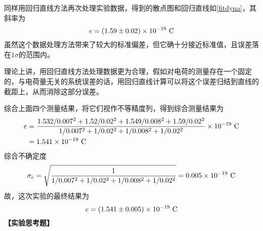 \documentclass[11pt,a4paper]{ctexart}
\newcommand{\beq}{\begin{equation}}
\newcommand{\eeq}{\end{equation}}
\newcommand{\bea}{\begin{equation}\begin{aligned}}
\newcommand{\eea}{\end{aligned}\end{equation}}
\begin{document}
同样用回归直线方法再次处理实验数据，得到的散点图和回归直线如\cref{fitdyna}，其斜率为
\beq
e = (1.59 \pm 0.02)\charge
\eeq
虽然这个数据处理方法带来了较大的标准偏差，但它确十分接近标准值，且误差落在$1\sigma$的范围内。
\par
理论上讲，用回归直线方法处理数据更为合理，假如对电荷的测量存在一个固定的，与电荷量无关的系统误差的话，用回归直线计算可以将这个误差归结到直线的截距上，从而消除这部分误差。
\par
综合上面四个测量结果，将它们视作不等精度列，得到综合测量结果为
\bea
e &= \frac{1.532/0.007^2 + 1.52/0.02^2 + 1.549/0.008^2 + 1.59/0.02^2}{1/0.007^2 + 1/0.02^2 + 1/0.008^2 + 1/0.02^2} \charge \\
&= 1.541\charge
\eea
综合不确定度
\beq
\sigma_e = \sqrt{\frac{1}{1/0.007^2 + 1/0.02^2 + 1/0.008^2 + 1/0.02^2}} = 0.005\charge
\eeq
故，这次实验的最终结果为
\beq
e = (1.541 \pm 0.005)\charge
\eeq
\newpage
\textbf{【实验思考题】}\par
\end{document}
